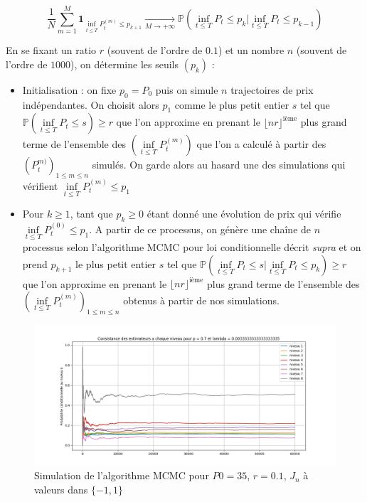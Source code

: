 \documentclass[a4paper,11pt]{article}
\begin{document}
\begin{equation*}
\frac{1}{N} \sum_{m=1}^{M} \mathbf{1}_{\underset{t \leq T}{\inf} P_t^{(m)} \leq p_{k+1}} \underset{M \rightarrow +\infty}{\longrightarrow} \mathbb{P} (\inf_{t \leq T} P_t \leq p_k | \underset{t \leq T}{\inf} P_t \leq p_{k-1})
\end{equation*}

En se fixant un ratio $r$ (souvent de l'ordre de $0.1$) et un nombre $n$ (souvent de l'ordre de $1000$), on détermine les seuils $(p_k)$ :\\

\begin{itemize}
\item Initialisation : on fixe $p_0 = P_0$ puis on simule $n$ trajectoires de prix indépendantes. On choisit alors $p_1$ comme le plus petit entier $s$ tel que $\mathbb{P}(\underset{t \leq T}{\inf} P_t \leq s) \geq r$ que l'on approxime en prenant  le $\lfloor{nr}\rfloor^{\text{ième}}$ plus grand terme de l'ensemble des $(\underset{t \leq T}{\inf} P_t^{(m)})$ que l'on a calculé à partir des $(P_t^{m)})_{1 \leq m \leq n}$ simulés. On garde alors au hasard une des simulations qui vérifient $\underset{t \leq T}{\inf} P_t^{(m)} \leq p_1$\\

\item Pour $k \geq 1$, tant que $p_k \geq 0$ étant donné une évolution de prix qui vérifie $\underset{t \leq T}{\inf} P_t^{(0)} \leq p_1$. A partir de ce processus, on génère une chaîne de $n$ processus selon l'algorithme MCMC pour loi conditionnelle décrit \textit{supra} et on prend $p_{k+1}$ le plus petit entier $s$ tel que $\mathbb{P}(\underset{t \leq T}{\inf} P_t \leq s | \underset{t \leq T}{\inf} P_t \leq p_k) \geq r$ que l'on approxime en prenant  le $\lfloor{nr}\rfloor^{\text{ième}}$ plus grand terme de l'ensemble des $(\underset{t \leq T}{\inf} P_t^{(m)})_{1 \leq m \leq n}$ obtenus à partir de nos simulations.

\end{itemize}

\begin{figure}
\begin{center}
\caption{Simulation de l'algorithme MCMC pour $P0=35$, $r=0.1$, $J_n$ à valeurs dans $\{-1,1\}$}
\includegraphics[scale=0.5]{"Q1 MCMC"}
\end{center}
\end{figure}
\end{document}
